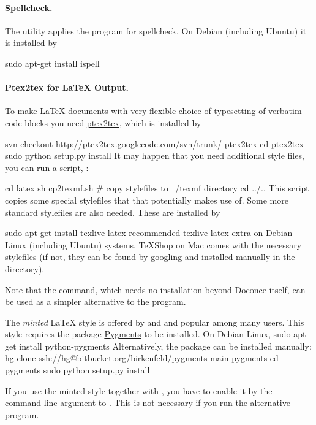 \documentclass[%
oneside,                 %
final,                   %
chapterprefix=true,      %
open=right               %
10pt]{book}
\begin{document}
\paragraph{Spellcheck.}
The utility  applies the  program for
spellcheck. On Debian (including Ubuntu) it is installed by

\bsys
sudo apt-get install ispell
\esys

\paragraph{Ptex2tex for {\LaTeX} Output.}
To make {\LaTeX} documents with very flexible choice of typesetting of
verbatim code blocks you need \href{{http://code.google.com/p/ptex2tex}}{ptex2tex},
which is installed by

\bsys
svn checkout http://ptex2tex.googlecode.com/svn/trunk/ ptex2tex
cd ptex2tex
sudo python setup.py install
\esys
It may happen that you need additional style files, you can run
a script, :

\bsys
cd latex
sh cp2texmf.sh  # copy stylefiles to ~/texmf directory
cd ../..
\esys
This script copies some special stylefiles that
that  potentially makes use of. Some more standard stylefiles
are also needed. These are installed by

\bsys
sudo apt-get install texlive-latex-recommended texlive-latex-extra
\esys
on Debian Linux (including Ubuntu) systems. TeXShop on Mac comes with
the necessary stylefiles (if not, they can be found by googling and installed
manually in the  directory).

Note that the  command, which needs no installation
beyond Doconce itself, can be used as a simpler alternative to the 
program.

The \emph{minted} {\LaTeX} style is offered by  and 
and popular among many
users. This style requires the package \href{{http://pygments.org}}{Pygments}
to be installed. On Debian Linux,
\bsys
sudo apt-get install python-pygments
\esys
Alternatively, the package can be installed manually:
\bsys
hg clone ssh://hg@bitbucket.org/birkenfeld/pygments-main pygments
cd pygments
sudo python setup.py install
\esys

If you use the minted style together with , you have to
enable it by the  command-line argument to .
This is not necessary if you run the alternative  program.
\end{document}
